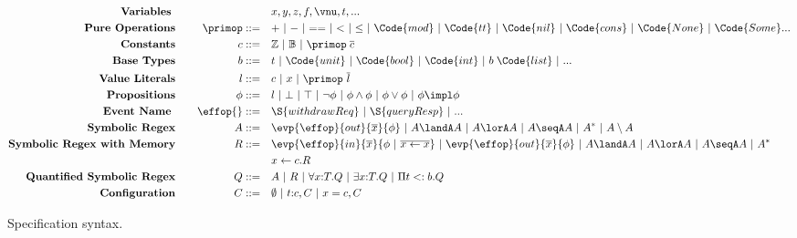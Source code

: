 \begin{figure}[t!]
{\small
\begin{alignat*}{2}
    \text{\textbf{Variables }}& \quad &\quad& x, y, z, f, \vnu, t, ...
    \\\text{\textbf{Pure Operations}}& \quad & \primop ::= \quad & {+} ~|~ {-} ~|~ {==} ~|~ {<} ~|~ {\leq} ~|~ \Code{mod} ~|~ \Code{tt} ~|~ \Code{nil} ~|~  \Code{cons} ~|~ \Code{None} ~|~ \Code{Some}...    
    \\ \text{\textbf{Constants}}& \quad & c ::= \quad & \mathbb{Z} ~|~ \mathbb{B} ~|~ \primop\; \overline{c}
    \\\text{\textbf{Base Types}}& \quad & b  ::= \quad &  t ~|~ \Code{unit} ~|~ \Code{bool} ~|~ \Code{int} ~|~ b\; \Code{list} ~|~ ...
    \\ \text{\textbf{Value Literals}}& \quad & l ::= \quad & c ~|~ x ~|~ \primop\ \overline{l}   
    \\ \text{\textbf{Propositions}}& \quad & \phi ::= \quad & l ~|~ \bot ~|~ \top  ~|~ \neg \phi ~|~ \phi \land \phi ~|~ \phi \lor \phi ~|~ \phi \impl \phi
    \\ \text{\textbf{Event Name }}& \quad & \effop{} ::= \quad & \S{withdrawReq} ~|~ \S{queryResp} ~|~ ...
    \\ \text{\textbf{Symbolic Regex}}& \quad &A  ::= \quad & \evp{\effop}{out}{\overline{x}}{\phi} ~|~ A \landA A ~|~ A \lorA A ~|~ A \seqA A ~|~ A^* ~|~ A \setminus A
    \\ \text{\textbf{Symbolic Regex with Memory}}& \quad &R  ::= \quad & \evp{\effop}{in}{\overline{x}}{\phi ~|~ \overline{x \leftarrow x}} ~|~ \evp{\effop}{out}{\overline{x}}{\phi} ~|~ A \landA A ~|~ A \lorA A ~|~ A \seqA A ~|~ A^*
    \\ & & & x \leftarrow c. R
    \\ \text{\textbf{Quantified Symbolic Regex}}& \quad &Q  ::= \quad & A ~|~ R ~|~ \forall x{:}T.Q ~|~ \exists x{:}T.Q ~|~ \Pi t <: b.Q
    \\ \text{\textbf{Configuration}}& \quad &C  ::= \quad & \emptyset ~|~ t{:}c, C ~|~ x = c, C 
  \end{alignat*}}
\caption{Specification syntax.}
\label{fig:spec-syntax}
\vspace{-.2cm}
\end{figure}

